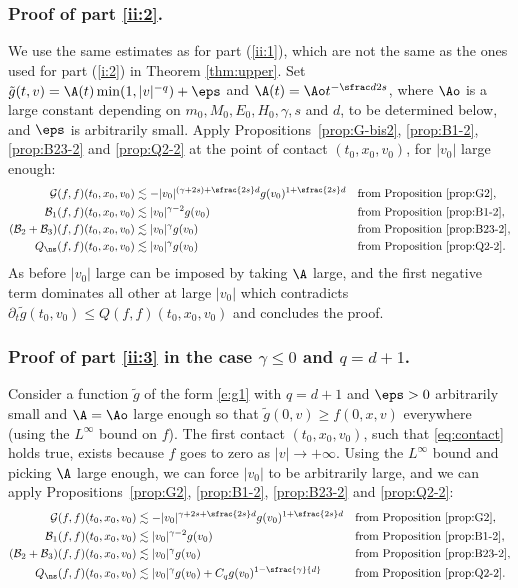 \subsubsection{Proof of part \eqref{ii:2}.} We use the same
estimates as for part (\ref{ii:1}), which are not the same as the ones
used for part (\ref{i:2}) in Theorem \ref{thm:upper}. Set
$\tilde g(t,v) = \A(t) \min(1,|v|^{-q}) + \eps$ and
$\A(t) = \Ao t^{-\sfrac d {2s}}$, where $\Ao$ is a large constant
depending on $m_0, M_0, E_0, H_0, \gamma, s$ and $d$, to be determined
below, and $\eps$ is arbitrarily small. Apply
Propositions~\ref{prop:G-bis2}, \ref{prop:B1-2}, \ref{prop:B23-2} and
\ref{prop:Q2-2} at the point of contact $(t_0,x_0,v_0)$, for $|v_0|$
large enough:
\begin{align*}
\mathcal G(f,f)(t_0,x_0,v_0) &\lesssim - |v_0|^{(\gamma+2s)+\sfrac{2s}d}
g(v_0)^{1+\sfrac{2s}d}
&& \text{from Proposition \ref{prop:G2}}, \\
\mathcal B_1(f,f)(t_0,x_0,v_0) &\lesssim |v_0|^{\gamma-2} g(v_0)
&& \text{from Proposition \ref{prop:B1-2}}, \\
(\mathcal B_2 + \mathcal B_3)(f,f)(t_0,x_0,v_0) &\lesssim |v_0|^{\gamma}
g(v_0)
&& \text{from Proposition \ref{prop:B23-2}},\\
Q_{\ns}(f,f)(t_0,x_0,v_0) &\lesssim |v_0|^\gamma g(v_0)
&& \text{from Proposition \ref{prop:Q2-2}}.
\end{align*}
As before $|v_0|$ large can be imposed by taking $\A$ large, and the
first negative term dominates all other at large $|v_0|$ which
contradicts $\partial_t \tilde g(t_0,v_0) \le Q(f,f)(t_0,x_0,v_0)$ and
concludes the proof.

\subsubsection{Proof of part \eqref{ii:3} in the case $\gamma \le 0$
and $q = d+1$.}

Consider a function $\tilde g$ of the form \eqref{e:g1} with $q=d+1$
and $\eps>0$ arbitrarily small and $\A=\Ao$ large enough so that
$\tilde g(0,v) \geq f(0,x,v)$ everywhere (using the $L^\infty$ bound on
$f$). The first contact $(t_0,x_0,v_0)$, such that \eqref{eq:contact}
holds true, exists because $f$ goes to zero as $|v| \to
+\infty$. Using the $L^\infty$ bound and picking $\A$ large enough, we
can force $|v_0|$ to be arbitrarily large, and we can apply
Propositions~\ref{prop:G2}, \ref{prop:B1-2}, \ref{prop:B23-2} and
\ref{prop:Q2-2}:
\begin{align*}
\mathcal G(f,f)(t_0,x_0,v_0) &\lesssim - |v_0|^{\gamma+2s+\sfrac{2s}d}
g(v_0)^{1+\sfrac{2s}d}
&& \text{from Proposition \ref{prop:G2}}, \\
\mathcal B_1(f,f)(t_0,x_0,v_0) &\lesssim |v_0|^{\gamma-2} g(v_0)
&& \text{from Proposition \ref{prop:B1-2}}, \\
(\mathcal B_2 + \mathcal B_3)(f,f)(t_0,x_0,v_0) &\lesssim |v_0|^{\gamma}
g(v_0)
&& \text{from Proposition \ref{prop:B23-2}},\\
Q_{\ns}(f,f)(t_0,x_0,v_0) &\lesssim |v_0|^\gamma g(v_0) + C_q g(v_0)^{1-\sfrac{\gamma}{d}}
&& \text{from Proposition \ref{prop:Q2-2}}.
\end{align*}

